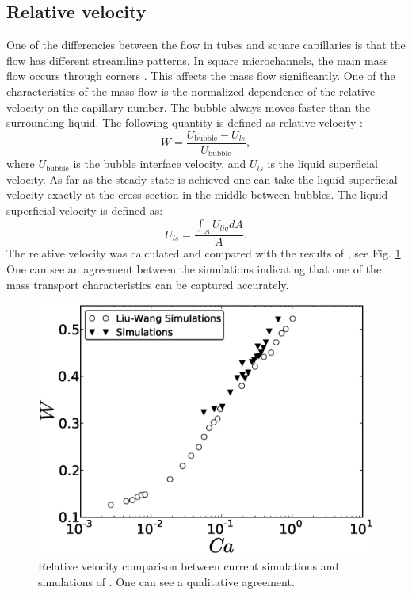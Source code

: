 \documentclass[preprint,12pt]{elsarticle}
\begin{document}
\subsection{Relative velocity}
One of the differencies between the flow in tubes and square capillaries is that the flow has
different streamline patterns. In square microchannels, the main mass flow occurs through corners
\cite{heil-threedim,wang-non-circular}. This affects the mass flow significantly. One of the
characteristics of the mass flow is the normalized dependence of the relative velocity on the
capillary
number. The bubble always moves faster than the surrounding liquid. The following quantity is
defined as
relative velocity \cite{cerro-bubble-train}:
\begin{equation}
W=\frac{U_{\mathrm{bubble}}-U_{ls}}{U_{\mathrm{bubble}}},
\end{equation}
where $U_{\mathrm{bubble}}$ is the bubble interface velocity, and $U_{ls}$ is the liquid superficial
velocity. As far as the steady state is achieved one can take the liquid superficial velocity
exactly at the cross section in the middle between bubbles. The liquid superficial velocity is
defined as:
\begin{equation}
U_{ls}=\frac{\int_{A}{U_{liq}dA}}{A}.
\end{equation}
The relative velocity was calculated and compared with the results of \citet{wang-non-circular},
see Fig. \ref{fig:relative:velocity}. One can see an agreement between the simulations indicating
that
one of the mass transport characteristics can be captured accurately. 
\begin{figure}[ht]
\includegraphics[width=\textwidth]{relative_velocity.eps}
\caption{Relative velocity comparison between current simulations and simulations of
\citet{wang-non-circular}. One can see a qualitative agreement. \label{fig:relative:velocity}}
\end{figure}
\end{document}
